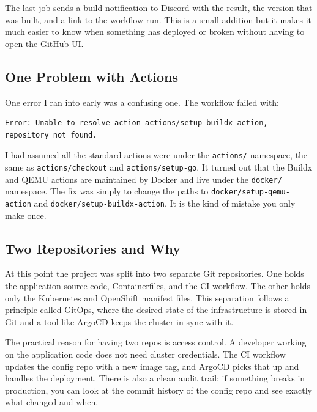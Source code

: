 The last job sends a build notification to Discord with the result, the version that was
built, and a link to the workflow run. This is a small addition but it makes it much
easier to know when something has deployed or broken without having to open the GitHub
UI.

\subsection{One Problem with Actions}

One error I ran into early was a confusing one. The workflow failed with:

\begin{lstlisting}
Error: Unable to resolve action actions/setup-buildx-action,
repository not found.
\end{lstlisting}

I had assumed all the standard actions were under the \texttt{actions/} namespace,
the same as \texttt{actions/checkout} and \texttt{actions/setup-go}. It turned out that
the Buildx and QEMU actions are maintained by Docker and live under the \texttt{docker/}
namespace. The fix was simply to change the paths to
\texttt{docker/setup-qemu-action} and \texttt{docker/setup-buildx-action}. It is the
kind of mistake you only make once.

\subsection{Two Repositories and Why}

At this point the project was split into two separate Git repositories. One holds the
application source code, Containerfiles, and the CI workflow. The other holds only the
Kubernetes and OpenShift manifest files. This separation follows a principle called
GitOps, where the desired state of the infrastructure is stored in Git and a tool like
ArgoCD keeps the cluster in sync with it.

The practical reason for having two repos is access control. A developer working on the
application code does not need cluster credentials. The CI workflow updates the config
repo with a new image tag, and ArgoCD picks that up and handles the deployment. There
is also a clean audit trail: if something breaks in production, you can look at the
commit history of the config repo and see exactly what changed and when.
